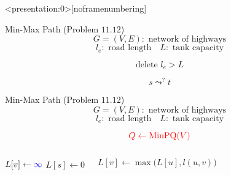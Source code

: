 \begin{frame}<presentation:0>[noframenumbering]
  \begin{exampleblock}{Min-Max Path (Problem $11.12$)}
    \[
      G = (V, E): \text{ network of highways}
    \]
    \[
      l_e: \text{ road length} \quad L: \text{ tank capacity}
    \]

    \vspace{0.30cm}
    \centerline{}
  \end{exampleblock}

  \pause
  \[
	\text{delete } l_e > L
  \]

  \pause
  \[
    s \leadsto^{?} t
  \]
\end{frame}

\begin{frame}
  \begin{exampleblock}{Min-Max Path (Problem $11.12$)}
    \[
      G = (V, E): \text{ network of highways}
    \]
    \[
      l_e: \text{ road length} \quad L: \text{ tank capacity}
    \]
	  
    \vspace{0.30cm}
    \centerline{}
  \end{exampleblock}

  \pause
  \[
    \textcolor{red}{Q \gets \text{MinPQ}(V)}
  \]

  \pause
  \begin{columns}
      \begin{algorithmic}
		  \State $L[v] \gets \textcolor{blue}{\infty}$
		\EndFor
		\State $L[s] \gets 0$
	  \end{algorithmic}
	  \begin{algorithmic}
		  \State $L[v] \gets \max\Big(L[u], l(u,v)\Big)$
		\EndIf
	  \end{algorithmic}
  \end{columns}
\end{frame}

